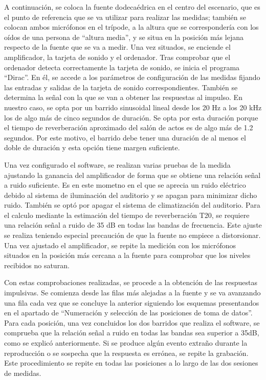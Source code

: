 \documentclass[11pt,a4paper,twoside]{book}
\begin{document}
            A continuación, se coloca la fuente dodecaédrica en el centro del escenario, que es el punto de referencia que se va utilizar para realizar las medidas; también se colocan ambos micrófonos en el trípode, a la altura que se correspondería con los oídos de una persona de ``altura media'', y se situa en la posición más lejana respecto de la fuente que se va a medir. Una vez situados, se enciende el amplificador, la tarjeta de sonido y el ordenador. Tras comprobar que el ordenador detecta correctamente la tarjeta de sonido, se inicia el programa ``Dirac''. En él, se accede a los parámetros de configuración de las medidas fijando las entradas y salidas de la tarjeta de sonido correspondientes. También se determina la señal con la que se van a obtener las respuestas al impulso. En nuestro caso, se opta por un barrido sinusoidal lineal desde los 20 Hz a los 20 kHz los  de algo más de cinco segundos de duración. Se opta por esta duración porque el tiempo de reverberación aproximado del salón de actos es de algo más de 1.2 segundos. Por este motivo, el barrido debe tener una duración de al menos el doble de duración y esta opción tiene margen suficiente.
        
            Una vez configurado el software, se realizan varias pruebas de la medida ajustando la ganancia del amplificador de forma que se obtiene una relación señal a ruido suficiente. Es en este mometno en el que se aprecia un ruido eléctrico debido al sistema de iluminación del auditorio y se apagan para minimizar dicho ruido. También se optó por apagar el sistema de climatización del auditorio. Para el calculo mediante la estimación del tiempo de reverberación T20, se requiere una relación señal a ruido de 35 dB en todas las bandas de frecuencia. Este ajuste se realiza teniendo especial precaución de que la fuente no empiece a distorsionar. Una vez ajustado el amplificador, se repite la medición con los micrófonos situados en la posición más cercana a la fuente para comprobar que los niveles recibidos no saturan.
        
            Con estas comprobaciones realizadas, se procede a la obtención de las respuestas impulsivas. Se comienza desde las filas más alejadas a la fuente y se va avanzando una fila cada vez que se concluye la anterior siguiendo los esquemas presentandos en el apartado de ``Numeración y selección de las posiciones de toma de datos''. Para cada posición, una vez concluidos los dos barridos que realiza el software, se comprueba que la relación señal a ruido en todas las bandas sea superior a 35dB, como se explicó anteriormente. Si se produce algún evento extraño durante la reproducción o se sospecha que la respuesta es errónea, se repite la grabación. Este procedimiento se repite en todas las posiciones a lo largo de las dos sesiones de medidas.
        
\end{document}
